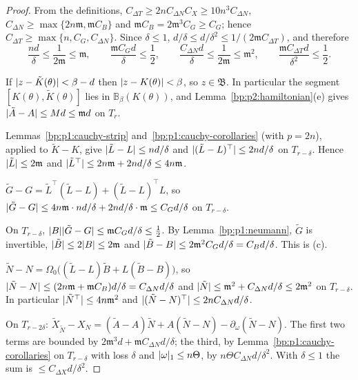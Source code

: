 \begin{proof}
\label{step:p2:pt-small}
From the definitions, $C_{\Delta T}\ge2nC_{\Delta N}C_X\ge10n^3C_{\Delta N}$, $C_{\Delta N}\ge\max\{2n
\mathfrak m,\mathfrak mC_B\}$ and $\mathfrak mC_B=2\mathfrak m^3C_G\ge C_G$; hence $C_{\Delta T}\ge
\max\{n,C_G,C_{\Delta N}\}$. Since $\delta\le1$, $d/\delta\le d/\delta^2\le1/(2\mathfrak mC_{\Delta T})$, and
therefore
\[
\frac{nd}\delta\le\frac1{2\mathfrak m}\le\mathfrak m,\qquad\frac{\mathfrak mC_Gd}\delta\le\frac12,\qquad
\frac{C_{\Delta N}d}\delta\le\frac1{2\mathfrak m}\le\mathfrak m^2,\qquad
\frac{\mathfrak mC_{\Delta T}d}{\delta^2}\le\frac12.
\]

\label{step:p2:pt-domain}
If $\lvert z-\tilde K(\theta)\rvert<\beta-d$ then $\lvert z-K(\theta)\rvert<\beta$, so $z\in\mathfrak B$. In
particular the segment $[K(\theta),\tilde K(\theta)]$ lies in $\mathbb B_\beta(K(\theta))$, and
Lemma~\ref{bp:p2:hamiltonian}(e) gives $\lvert \tilde A-A\rvert\le Md\le\mathfrak md$ on $T_r$.

\label{step:p2:pt-dl}
Lemmas~\ref{bp:p1:cauchy-strip} and~\ref{bp:p1:cauchy-corollaries} (with $p=2n$), applied to $\tilde K-K$,
give $\lvert \tilde L-L\rvert\le nd/\delta$ and $\lvert (\tilde L-L)^\top\rvert\le2nd/\delta$ on $T_{r-\delta}$. Hence $\lvert \tilde L\rvert\le2\mathfrak m$ and
$\lvert \tilde L^\top\rvert\le2n\mathfrak m+2nd/\delta\le4n\mathfrak m$.

\label{step:p2:pt-gram}
$\tilde G-G=\tilde L^\top(\tilde L-L)+(\tilde L-L)^\top L$, so $\lvert \tilde G-G\rvert\le4n\mathfrak m\cdot
nd/\delta+2nd/\delta\cdot\mathfrak m\le C_Gd/\delta$ on $T_{r-\delta}$.

\label{step:p2:pt-binv}
On $T_{r-\delta}$, $\lvert B\rvert\lvert \tilde G-G\rvert\le\mathfrak mC_Gd/\delta\le\frac12$. By
Lemma~\ref{bp:p1:neumann}, $\tilde G$ is invertible, $\lvert \tilde B\rvert\le2\lvert B\rvert\le2\mathfrak m$ and
$\lvert \tilde B-B\rvert\le2\mathfrak m^2C_Gd/\delta=C_Bd/\delta$. This is (c).

\label{step:p2:pt-n}
$\tilde N-N=\Omega_0\bigl((\tilde L-L)\tilde B+L(\tilde B-B)\bigr)$, so $\lvert \tilde N-N\rvert\le
(2n\mathfrak m+\mathfrak mC_B)d/\delta=C_{\Delta N}d/\delta$ and $\lvert \tilde N\rvert\le\mathfrak m^2+
C_{\Delta N}d/\delta\le2\mathfrak m^2$ on $T_{r-\delta}$. In particular $\lvert \tilde N^\top\rvert\le
4n\mathfrak m^2$ and $\lvert (\tilde N-N)^\top\rvert\le2nC_{\Delta N}d/\delta$.

\label{step:p2:pt-xn}
On $T_{r-2\delta}$: $\tilde X_{\tilde N}-X_N=(\tilde A-A)\tilde N+A(\tilde N-N)-\partial_\omega(\tilde
N-N)$. The first two terms are bounded by $2\mathfrak m^3d+\mathfrak mC_{\Delta N}d/\delta$; the third,
by Lemma~\ref{bp:p1:cauchy-corollaries} on $T_{r-\delta}$ with loss $\delta$ and $\lvert \omega\rvert_1\le n\Theta$, by
$n\Theta C_{\Delta N}d/\delta^2$. With $\delta\le1$
the sum is $\le C_{\Delta X}d/\delta^2$.


\end{proof}
